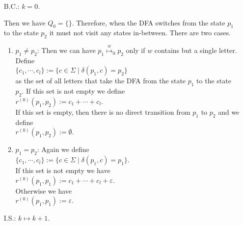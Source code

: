 \begin{enumerate}
\item[B.C.:] $k = 0$.  

  Then we have $Q_0 = \{\}$.
  Therefore, when the \textsc{DFA} switches from the state $p_1$ to the state $p_2$ it must not visit any
  states in-between.  There are two cases.
  \begin{enumerate}
  \item $p_1 \not= p_2$:  Then we can have  $p_1 \stackrel{w}{\mapsto}_0 p_2$ only if $w$ contains but a
        single letter.  Define
        \\[0.2cm]
        \hspace*{1.3cm}
        $\{ c_1, \cdots, c_l \} := \{ c \in \Sigma \mid \delta(p_1,c) = p_2 \}$
        \\[0.2cm]
        as the set of all letters that take the \textsc{DFA} from the state $p_1$ to the state $p_2$.
        If this set is not empty we define 
        \\[0.2cm]
        \hspace*{1.3cm}
        $r^{(0)}(p_1, p_2) := c_1 + \cdots + c_l$. 
        \\[0.2cm]
        If this set is empty, then there is no direct transition from  $p_1$ to $p_2$ and we define
        \\[0.2cm]
        \hspace*{1.3cm}
        $r^{(0)}(p_1, p_2) := \emptyset$.
  \item $p_1 = p_2$:  Again we define
        \\[0.2cm]
        \hspace*{1.3cm}
        $\{ c_1, \cdots, c_l \} := \{ c \in \Sigma \mid \delta(p_1,c) = p_1 \}$.
        \\[0.2cm]
        If this set is not empty we have
        \\[0.2cm]
        \hspace*{1.3cm}
        $r^{(0)}(p_1, p_1) := c_1 + \cdots + c_l + \varepsilon$.
        \\[0.2cm]
        Otherwise we have
        \\[0.2cm]
        \hspace*{1.3cm}
        $r^{(0)}(p_1, p_1) := \varepsilon$.
   \end{enumerate}
\item[I.S.:] $k \mapsto k+1$.  


\end{enumerate}
